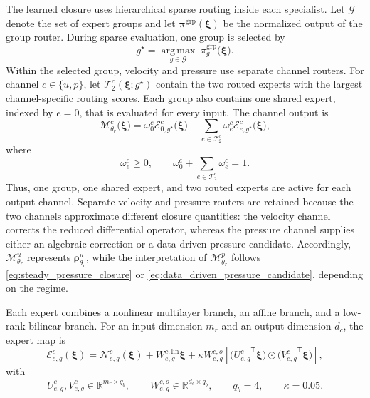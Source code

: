 The learned closure uses hierarchical sparse routing inside each specialist.
Let $\mathcal{G}$ denote the set of expert groups and let
$\boldsymbol{\pi}^{\mathrm{grp}}(\boldsymbol{\xi})$ be the normalized output
of the group router.  During sparse evaluation, one group is selected by
\begin{equation}
  g^{\star}
  =
  \underset{g\in\mathcal{G}}{\operatorname{arg\,max}}
  \;\pi^{\mathrm{grp}}_{g}
  \bigl(
    \boldsymbol{\xi}
  \bigr).
  \label{eq:group_top1}
\end{equation}
Within the selected group, velocity and pressure use separate channel
routers.  For channel $c\in\{u,p\}$, let
$\mathcal{T}^{c}_{2}(\boldsymbol{\xi};g^{\star})$ contain the two routed
experts with the largest channel-specific routing scores.  Each group also
contains one shared expert, indexed by $e=0$, that is evaluated for every
input.  The channel output is
\begin{equation}
  \boldsymbol{\mathcal{M}}^{c}_{\theta_r}
  \bigl(
    \boldsymbol{\xi}
  \bigr)
  =
  \omega^{c}_{0}
  \mathcal{E}^{c}_{0,g^{\star}}
  \bigl(
    \boldsymbol{\xi}
  \bigr)
  +
  \sum_{e\in\mathcal{T}^{c}_{2}}
  \omega^{c}_{e}
  \mathcal{E}^{c}_{e,g^{\star}}
  \bigl(
    \boldsymbol{\xi}
  \bigr),
  \label{eq:channel_sparse_moe}
\end{equation}
where
\begin{equation}
  \omega^{c}_{e}\geq 0,
  \qquad
  \omega^{c}_{0}
  +
  \sum_{e\in\mathcal{T}^{c}_{2}}
  \omega^{c}_{e}
  =
  1.
  \label{eq:channel_sparse_weights}
\end{equation}
Thus, one group, one shared expert, and two routed experts are active for each
output channel.  Separate velocity and pressure routers are retained because
the two channels approximate different closure quantities: the velocity
channel corrects the reduced differential operator, whereas the pressure
channel supplies either an algebraic correction or a data-driven pressure
candidate.  Accordingly,
$\boldsymbol{\mathcal{M}}^{u}_{\theta_r}$ represents
$\boldsymbol{\rho}^{u}_{\theta_r}$, while the interpretation of
$\boldsymbol{\mathcal{M}}^{p}_{\theta_r}$ follows
\eqref{eq:steady_pressure_closure} or
\eqref{eq:data_driven_pressure_candidate}, depending on the regime.

Each expert combines a nonlinear multilayer branch, an affine branch, and a
low-rank bilinear branch.  For an input dimension $m_r$ and an output
dimension $d_c$, the expert map is
\begin{equation}
  \mathcal{E}^{c}_{e,g}
  (\boldsymbol{\xi})
  =
  \mathcal{N}^{c}_{e,g}
  (\boldsymbol{\xi})
  +
  W^{c,\mathrm{lin}}_{e,g}
  \boldsymbol{\xi}
  +
  \kappa
  W^{c,o}_{e,g}
  \left[
    \bigl(
      {U^{c}_{e,g}}^{\mathsf T}\boldsymbol{\xi}
    \bigr)
    \odot
    \bigl(
      {V^{c}_{e,g}}^{\mathsf T}\boldsymbol{\xi}
    \bigr)
  \right],
  \label{eq:physics_aware_expert}
\end{equation}
with
\begin{equation}
  U^{c}_{e,g},V^{c}_{e,g}
  \in
  \mathbb{R}^{m_r\times q_b},
  \qquad
  W^{c,o}_{e,g}
  \in
  \mathbb{R}^{d_c\times q_b},
  \qquad
  q_b=4,
  \qquad
  \kappa=0.05.
  \label{eq:expert_bilinear_dimensions}
\end{equation}


